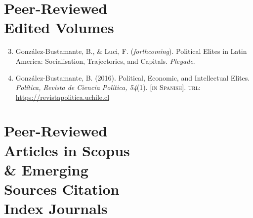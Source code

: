 \documentclass[letterpaper,margin]{res}
\newenvironment{benumerate}[1]{
    \let\oldItem\item
    \def\item{\addtocounter{enumi}{-2}\oldItem}
    \begin{enumerate}
    \setcounter{enumi}{#1}
    \addtocounter{enumi}{1}
}{
    \end{enumerate}
}
\begin{document}
\begin{resume}





\section{\footnotesize Peer-Reviewed \\ Edited Volumes}

\begin{benumerate}{2}
\item{\small Gonz\'alez-Bustamante, B., \& Luci, F. ({\itshape forthcoming}). Political Elites in Latin America: Socialisation, Trajectories, and Capitals. {\itshape Pleyade}.}\vspace{1mm}

\item{\small Gonz\'alez-Bustamante, B. (2016). Political, Economic, and Intellectual Elites. {\itshape Pol\'itica, Revista de Ciencia Pol\'itica, 54}(1). {\footnotesize \scshape [in Spanish]}. {\scshape url}: \href{https://revistapolitica.uchile.cl/index.php/RP/issue/view/4365}{https://revistapolitica.uchile.cl}}
\end{benumerate}


\section{\footnotesize Peer-Reviewed \\ Articles in Scopus \\ \& Emerging \\ Sources Citation \\ Index Journals}


\end{resume}
\end{document}
